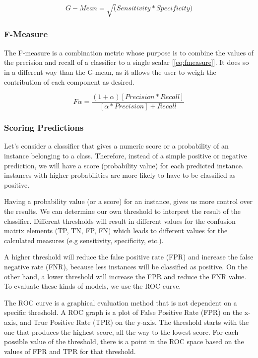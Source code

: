 \begin{equation}
    G-Mean = \sqrt(Sensitivity*Specificity) 
    \label{eq:gmean}
\end{equation}

\subsubsection{F-Measure}
The F-measure is a combination metric whose purpose is to combine the values of the precision and 
recall of a classifier to a single scalar [\ref{eq:fmeasure}]. It does so in a different way than the G-mean, 
as it allows the user to weigh the contribution of each component as desired.

\begin{equation}
    F \alpha = \frac{(1+\alpha)[Precision*Recall]}{[\alpha*Precision]+Recall} 
    \label{eq:fmeasure}
\end{equation}

\subsubsection{Scoring Predictions}

Let’s consider a classifier that gives a numeric score or a probability of an instance belonging to a 
class. Therefore, instead of a simple positive or negative prediction, we will have a score 
(probability value) for each predicted instance. instances with higher probabilities are more 
likely to have to be classified as positive.

Having a probability value (or a score) for an instance, gives us more control over the results. 
We can determine our own threshold to interpret the result of the classifier. Different thresholds 
will result in different values for the confusion matrix elements (TP, TN, FP, FN) which leads to 
different values for the calculated measures (e.g sensitivity, specificity, etc.).

A higher threshold will reduce the false positive rate (FPR) and increase the false negative rate 
(FNR), because less instances will be classified as positive. On the other hand, a lower threshold 
will increase the FPR and reduce the FNR value. To evaluate these kinds of models, we use the ROC curve.

The ROC curve \cite{fawcett2006introduction} is a graphical evaluation method that is not dependent 
on a specific threshold. A ROC graph is a plot of False Positive Rate (FPR) on the x-axis, and 
True Positive Rate (TPR) on the y-axis. The threshold starts with the one that produces the highest 
score, all the way to the lowest score. For each possible value of the threshold, there is a point 
in the ROC space based on the values of FPR and TPR for that threshold.

